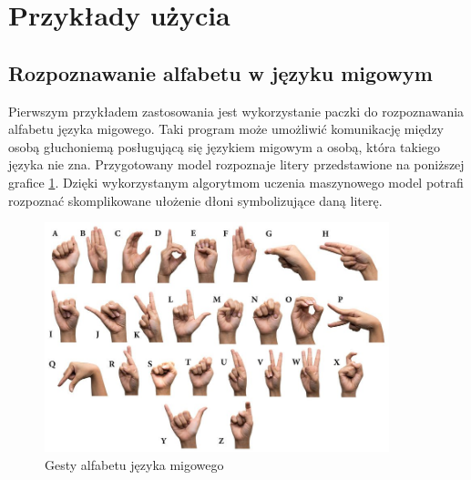 \newpage
\section{Przykłady użycia}
\subsection{Rozpoznawanie alfabetu w języku migowym}
\quad Pierwszym przykładem zastosowania jest wykorzystanie paczki do rozpoznawania alfabetu języka migowego. Taki program może umożliwić komunikację między osobą głuchoniemą posługującą się językiem migowym a osobą, która takiego języka nie zna. Przygotowany model rozpoznaje litery przedstawione na poniższej grafice \ref{img:alphabet}. Dzięki wykorzystanym algorytmom uczenia maszynowego model potrafi rozpoznać skomplikowane ułożenie dłoni symbolizujące daną literę.  


\begin{figure}[H]
    \begin{center}
        \includegraphics[width=10cm]{../images/american_sign_language.jpg}
        \caption{Gesty alfabetu języka migowego}
        \label{img:alphabet}
    \end{center}
\end{figure}


